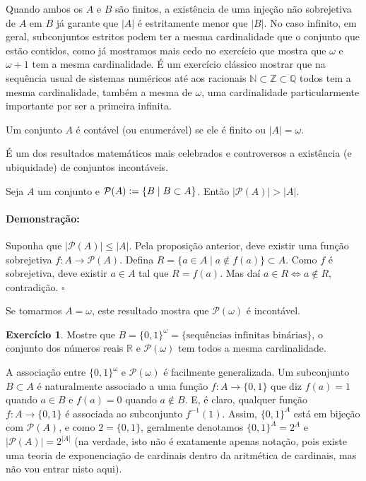 \documentclass[11pt]{article}
\newcommand{\defeq}{\vcentcolon=}
\newcommand{\pulinho}{\vspace{.5cm}}
\newcommand{\luamedio}{
\emoji{first-quarter-moon}
}
\theoremstyle{definition}
\theoremstyle{definition}
\newtheorem*{theorem*}{Teorema}
\newenvironment{teorema*}{
\definecolor{shadecolor}{HTML}{f59aa3}
\begin{shaded}
\begin{theorem*}
}
{
\end{theorem*}
\end{shaded}
}
\theoremstyle{definition}
\theoremstyle{definition}
\theoremstyle{definition}
\theoremstyle{definition}
\theoremstyle{definition}
\theoremstyle{definition}
\newtheorem*{definition*}{Definição}
\newenvironment{definicao*}{
\definecolor{shadecolor}{HTML}{defcfc}
\begin{shaded}
\begin{definition*}
}
{
\end{definition*}
\end{shaded}
}
\theoremstyle{definition}
\theoremstyle{definition}
\theoremstyle{definition}
\theoremstyle{definition}
\newenvironment{prova}{\paragraph{Demonstração:}}{\hfill$\square$ 
\pulinho
}
\theoremstyle{definition}
\newtheorem{exersisio}{Exercício}
\newenvironment{exercicio}{
\definecolor{shadecolor}{HTML}{CFB5FF}
\begin{shaded}
\begin{exersisio}
}
{
\end{exersisio}
\end{shaded}
}
\begin{document}
Quando ambos os $A$ e $B$ são finitos, a existência de uma injeção não sobrejetiva de $A$ em $B$ já garante que $|A|$ é estritamente menor que $|B|$. No caso infinito, em geral, subconjuntos estritos podem ter a mesma cardinalidade que o conjunto que estão contidos, como já mostramos mais cedo no exercício que mostra que $\omega$ e $\omega + 1$ tem a mesma cardinalidade. É um exercício clássico mostrar que na sequência usual de sistemas numéricos até aos racionais $\mathbb{N} \subset \mathbb{Z} \subset \mathbb{Q}$ todos tem a mesma cardinalidade, também a mesma de $\omega$, uma cardinalidade particularmente importante por ser a primeira infinita.

\begin{definicao*}[Contáveis]
  Um conjunto $A$ é contável (ou enumerável) se ele é finito ou $|A| = \omega$.
\end{definicao*}

É um dos resultados matemáticos mais celebrados e controversos a existência (e ubiquidade) de conjuntos incontáveis.

\begin{teorema*}
  Seja $A$ um conjunto e $\mathcal{P}(A) \defeq \{B \mid B \subset A\}$. Então $|\mathcal{P}(A)| > |A|$. 
\end{teorema*}
\begin{prova}
  Suponha que $|\mathcal{P}(A)| \leq |A|$. Pela proposição anterior, deve existir uma função sobrejetiva $f: A \rightarrow \mathcal{P}(A)$. Defina $R = \{a \in A \mid a \notin f(a)\} \subset A$. Como $f$ é sobrejetiva, deve existir $a \in A$ tal que $R = f(a)$. Mas daí $a \in R \iff a \notin R$, contradição.
\end{prova}

Se tomarmos $A = \omega$, este resultado mostra que $\mathcal{P}(\omega)$ é incontável.

\begin{exercicio}
  \luamedio Mostre que $B = \{0,1\}^{\omega} = \{\text{sequências infinitas binárias} \}$, o conjunto dos números reais $\mathbb{R}$ e $\mathcal{P}(\omega)$ tem todos a mesma cardinalidade.
\end{exercicio}

A associação entre $\{0,1\}^{\omega}$ e $\mathcal{P}(\omega)$ é facilmente generalizada. Um subconjunto $B \subset A$ é naturalmente associado a uma função $f: A \rightarrow \{0,1\}$ que diz $f(a) = 1$ quando $a \in B$ e $f(a) = 0$ quando $a \notin B$. E, é claro, qualquer função $f: A \rightarrow \{0,1\}$ é associada ao subconjunto $f^{-1}(1)$. Assim, $\{0,1\}^{A}$ está em bijeção com $\mathcal{P}(A)$, e como $2 = \{0,1\}$, geralmente denotamos $\{0,1\}^{A} = 2^A$ e $|\mathcal{P}(A)| = 2^{|A|}$ (na verdade, isto não é exatamente apenas notação, pois existe uma teoria de exponenciação de cardinais dentro da aritmética de cardinais, mas não vou entrar nisto aqui).
\end{document}
